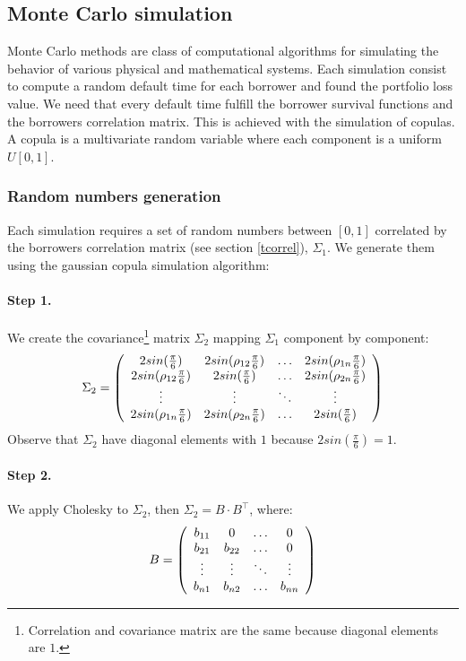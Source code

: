 \documentclass[a4paper,12pt,final]{article}
\begin{document}
\subsection{Monte Carlo simulation}
Monte Carlo methods \cite{mc:mervyn} are class of computational algorithms for 
simulating the behavior of various physical and mathematical systems. 
Each simulation consist to compute a random default time for each borrower and
found the portfolio loss value. We need that every default time fulfill the
borrower survival functions and the borrowers correlation matrix. This is 
achieved with the simulation of copulas. A copula \cite{copu:pitfalls} 
\cite{copu:wang}is a multivariate random variable where each component is a 
uniform $U[0,1]$.

\subsubsection{Random numbers generation}
Each simulation requires a set of random numbers between $[0, 1]$ correlated by 
the borrowers correlation matrix (see section \ref{tcorrel}), $\Sigma_1$. 
We generate them using the gaussian copula simulation algorithm:

\paragraph{Step 1.} We create the covariance\footnote{Correlation and covariance 
matrix are the same because diagonal elements are $1$.} matrix $\Sigma_2$ mapping 
$\Sigma_1$ component by component:
\begin{displaymath}
\Sigma_2 = \left( 
\begin{array}{cccc}
2 sin(\frac{\pi}{6})           & 2 sin(\rho_{12} \frac{\pi}{6}) & \ldots & 2 sin(\rho_{1n} \frac{\pi}{6})\cr
2 sin(\rho_{12} \frac{\pi}{6}) & 2 sin(\frac{\pi}{6})           & \ldots & 2 sin(\rho_{2n} \frac{\pi}{6})\cr
\vdots                         & \vdots                         & \ddots  & \vdots   \cr
2 sin(\rho_{1n} \frac{\pi}{6}) & 2 sin(\rho_{2n} \frac{\pi}{6}) & \ldots & 2 sin(\frac{\pi}{6})
\end{array}
\right)
\end{displaymath}
Observe that $\Sigma_2$ have diagonal elements with $1$ because $2 sin(\frac{\pi}{6}) = 1$.

\paragraph{Step 2.} We apply Cholesky to $\Sigma_2$, then $\Sigma_2 = B \cdot B^{\top}$, 
where:
\begin{displaymath}
B = 
\left(
\begin{array}{cccc}
b_{11}   & 0        & \ldots & 0       \cr
b_{21}   & b_{22}   & \ldots & 0       \cr
\vdots  & \vdots  & \ddots & \vdots \cr
b_{n1}   & b_{n2}   & \ldots & b_{nn}
\end{array}
\right)
\end{displaymath}
\end{document}
